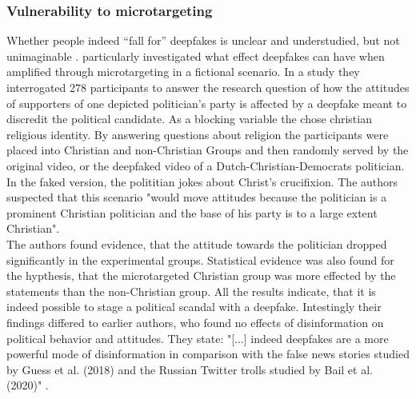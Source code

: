 \documentclass[
  a4paper,  %
  twoside,  %
  bibliography=totoc,
  headsepline,
  cleardoublepage=empty,
  parskip=half,
  draft=false
]{scrbook}
\begin{document}
\subsubsection*{Vulnerability to microtargeting}
Whether people indeed “fall for” deepfakes is unclear and understudied, but not unimaginable \cite{dobberMicrotargetedDeepfakesHave2021}. \citet{dobberMicrotargetedDeepfakesHave2021} particularly investigated what effect deepfakes can have when amplified through microtargeting in a fictional scenario. In a study they interrogated 278 participants to answer the research question of how the attitudes of supporters of one depicted politician's party is affected by a deepfake meant to discredit the political candidate. As a blocking variable the chose christian religious identity. By answering questions about religion the participants were placed into Christian and non-Christian Groups and then randomly served by the original video, or the deepfaked video of a Dutch-Christian-Democrats politician. In the faked version, the polititian jokes about Christ's crucifixion. The authors suspected that this scenario "would move attitudes because the politician is a prominent Christian politician and the base of his party is to a large extent Christian". \\
The authors found evidence, that the attitude towards the politician dropped significantly in the experimental groups.
Statistical evidence was also found for the hypthesis, that the microtargeted Christian group was more effected by the statements than the non-Christian group. All the results indicate, that it is indeed possible to stage a political scandal with a deepfake. Intestingly their findings differed to earlier authors, who found no effects of disinformation on political behavior and attitudes. They state: "[...] indeed deepfakes are a more powerful mode of disinformation in comparison with the false news stories studied by Guess et al. (2018) and the Russian Twitter trolls studied by Bail et al. (2020)" \cite{dobberMicrotargetedDeepfakesHave2021}.
\end{document}
